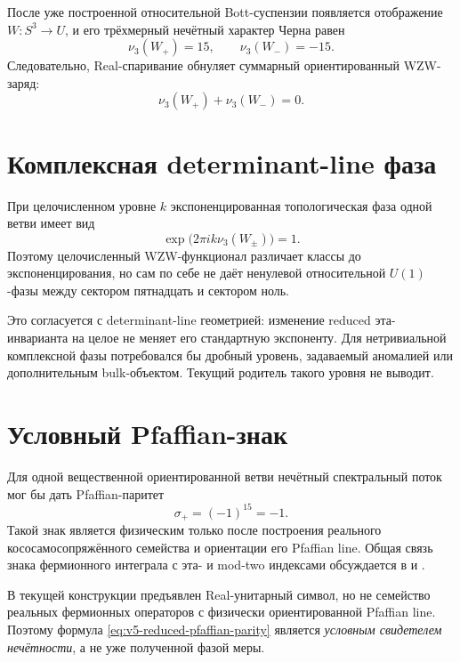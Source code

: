 После уже построенной относительной Bott-суспензии появляется отображение
$W:S^3\to U$, и его трёхмерный нечётный характер Черна равен
\begin{equation}
 \nu_3(W_+)=15,
 \qquad
 \nu_3(W_-)=-15.
 \label{eq:v5-bott-wzw-charges}
\end{equation}
Следовательно, Real-спаривание обнуляет суммарный ориентированный
WZW-заряд:
\begin{equation}
 \nu_3(W_+)+\nu_3(W_-)=0.
\end{equation}

\section{Комплексная determinant-line фаза}

При целочисленном уровне $k$ экспоненцированная топологическая фаза одной
ветви имеет вид
\begin{equation}
 \exp\bigl(2\pi i k\nu_3(W_\pm)\bigr)=1.
 \label{eq:v5-integer-wzw-phase-trivial}
\end{equation}
Поэтому целочисленный WZW-функционал различает классы до экспоненцирования,
но сам по себе не даёт ненулевой относительной $U(1)$-фазы между сектором
пятнадцать и сектором ноль.

Это согласуется с determinant-line геометрией: изменение reduced
эта-инварианта на целое не меняет его стандартную экспоненту. Для
нетривиальной комплексной фазы потребовался бы дробный уровень, задаваемый
аномалией или дополнительным bulk-объектом. Текущий родитель такого уровня
не выводит.

\section{Условный Pfaffian-знак}

Для одной вещественной ориентированной ветви нечётный спектральный поток
мог бы дать Pfaffian-паритет
\begin{equation}
 \sigma_+=(-1)^{15}=-1.
 \label{eq:v5-reduced-pfaffian-parity}
\end{equation}
Такой знак является физическим только после построения реального
кососамосопряжённого семейства и ориентации его Pfaffian line. Общая связь
знака фермионного интеграла с эта- и mod-two индексами обсуждается в
 и .

В текущей конструкции предъявлен Real-унитарный символ, но не семейство
реальных фермионных операторов с физически ориентированной Pfaffian line.
Поэтому формула \eqref{eq:v5-reduced-pfaffian-parity} является
\emph{условным свидетелем нечётности}, а не уже полученной фазой меры.

